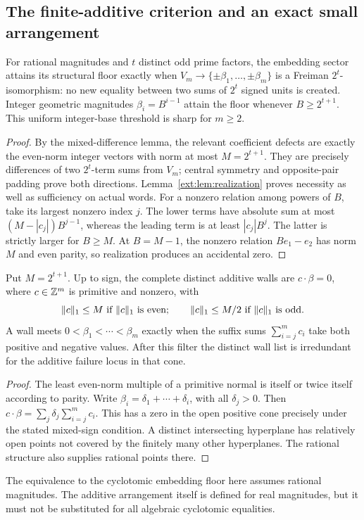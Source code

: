 \subsection{The finite-additive criterion and an exact small arrangement}\label{ext:sec:freiman}
\begin{theorem}\label{ext:thm:freiman}
For rational magnitudes and $t$ distinct odd prime factors, the embedding sector attains its structural floor exactly when $V_m\to\{\pm\beta_1,\ldots,\pm\beta_m\}$ is a Freiman $2^t$-isomorphism: no new equality between two sums of $2^t$ signed units is created. Integer geometric magnitudes $\beta_i=B^{i-1}$ attain the floor whenever $B\ge2^{t+1}$. This uniform integer-base threshold is sharp for $m\ge2$.
\end{theorem}
\begin{proof}
By the mixed-difference lemma, the relevant coefficient defects are exactly the even-norm integer vectors with norm at most $M=2^{t+1}$. They are precisely differences of two $2^t$-term sums from $V_m$; central symmetry and opposite-pair padding prove both directions. Lemma~\ref{ext:lem:realization} proves necessity as well as sufficiency on actual words. For a nonzero relation among powers of $B$, take its largest nonzero index $j$. The lower terms have absolute sum at most $(M-|c_j|)B^{j-1}$, whereas the leading term is at least $|c_j|B^j$. The latter is strictly larger for $B\ge M$. At $B=M-1$, the nonzero relation $B e_1-e_2$ has norm $M$ and even parity, so realization produces an accidental zero.
\end{proof}

\begin{proposition}\label{ext:prop:normal}
Put $M=2^{t+1}$. Up to sign, the complete distinct additive walls are $c\cdot\beta=0$, where $c\in\mathbb Z^m$ is primitive and nonzero, with
\[
\lVert c\rVert_1\le M\ \text{if }\lVert c\rVert_1\text{ is even};\qquad
\lVert c\rVert_1\le M/2\ \text{if }\lVert c\rVert_1\text{ is odd}.
\]
A wall meets $0<\beta_1<\cdots<\beta_m$ exactly when the suffix sums $\sum_{i=j}^m c_i$ take both positive and negative values. After this filter the distinct wall list is irredundant for the additive failure locus in that cone.
\end{proposition}
\begin{proof}
The least even-norm multiple of a primitive normal is itself or twice itself according to parity. Write $\beta_i=\delta_1+\cdots+\delta_i$, with all $\delta_j>0$. Then $c\cdot\beta=\sum_j\delta_j\sum_{i=j}^m c_i$. This has a zero in the open positive cone precisely under the stated mixed-sign condition. A distinct intersecting hyperplane has relatively open points not covered by the finitely many other hyperplanes. The rational structure also supplies rational points there.
\end{proof}
The equivalence to the cyclotomic embedding floor here assumes rational magnitudes. The additive arrangement itself is defined for real magnitudes, but it must not be substituted for all algebraic cyclotomic equalities.

